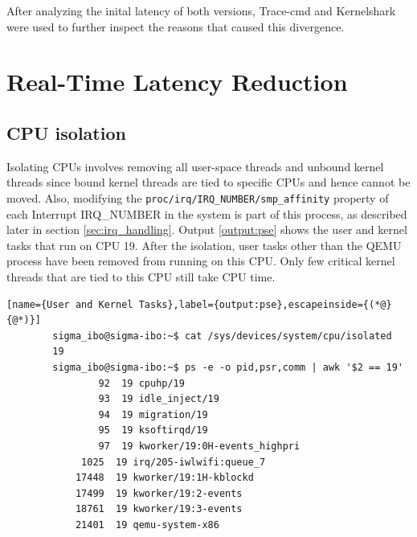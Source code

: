 \documentclass[MMR,Master,english]{twbook}
\begin{document}
After analyzing the inital latency of both versions, Trace-cmd and Kernelshark were used to further inspect the reasons that caused this divergence.
\clearpage

\chapter{Real-Time Latency Reduction}\label{cha:latency_reduction}
\section{CPU isolation}
Isolating CPUs involves removing all user-space threads and unbound kernel threads since bound kernel threads are tied to specific CPUs and hence cannot be moved. Also, modifying the \texttt{proc/irq/IRQ\_NUMBER/smp\_affinity} property of each Interrupt IRQ\_NUMBER in the system is part of this process, as described later in section \ref{sec:irq_handling}. Output \ref{output:pse} shows the user and kernel tasks that run on CPU 19. After the isolation, user tasks other than the QEMU process have been removed from running on this CPU. Only few critical kernel threads that are tied to this CPU still take CPU time.

\vspace{1em}
\begin{minipage}{0.95\columnwidth}
	\begin{lstlisting}[name={User and Kernel Tasks},label={output:pse},escapeinside={(*@}{@*)}]
		sigma_ibo@sigma-ibo:~$ cat /sys/devices/system/cpu/isolated
		19
		sigma_ibo@sigma-ibo:~$ ps -e -o pid,psr,comm | awk '$2 == 19'
				92  19 cpuhp/19
				93  19 idle_inject/19
 	    		94  19 migration/19
 	    		95  19 ksoftirqd/19
 	    		97  19 kworker/19:0H-events_highpri
 	 		 1025  19 irq/205-iwlwifi:queue_7
 	 		17448  19 kworker/19:1H-kblockd
 	 		17499  19 kworker/19:2-events
 	 		18761  19 kworker/19:3-events
			21401  19 qemu-system-x86
\end{lstlisting}
\end{minipage}

\clearpage
\end{document}
